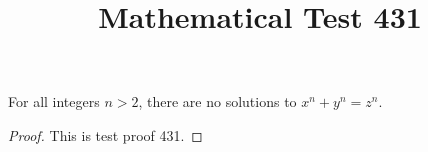 \documentclass{amsart}
\begin{document}
\title{Mathematical Test 431}
\begin{theorem}
For all integers $n > 2$, there are no solutions to $x^n + y^n = z^n$.
\end{theorem}
\begin{proof}
This is test proof 431.
\end{proof}
\end{document}
